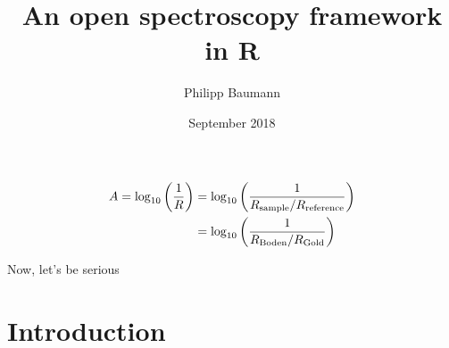 \documentclass{article}
\title{An open spectroscopy framework in R}
\author{Philipp Baumann}
\date{September 2018}
\begin{document}
\maketitle

\begin{equation}
\begin{split}
    A = \log_{10}\left({\frac{1}{R}}\right) & = \log_{10}\left({\frac{1}{R_\textnormal{sample} / R_\textnormal{reference}}}\right) \\ & =
    \log_{10}\left({\frac{1}{R_\textnormal{Boden} / R_\textnormal{Gold}}}\right)
\end{split}
\end{equation}

Now, let's be serious

\section{Introduction}
\end{document}
